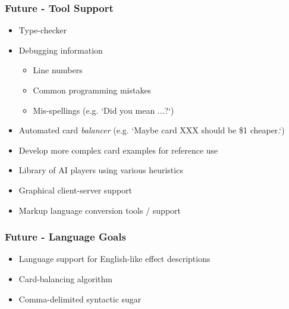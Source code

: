 
\begin{frame} \frametitle{Future - Tool Support}
\begin{itemize}
\item Type-checker
\item Debugging information
  \begin{itemize}
  \item Line numbers
  \item Common programming mistakes
  \item Mis-spellings (e.g. `Did you mean ...?`)
  \end{itemize}
\item Automated card \emph{balancer} (e.g. `Maybe card XXX should be \$1 cheaper.`)
\item Develop more complex card examples for reference use
\item Library of AI players using various heuristics
\item Graphical client-server support
\item Markup language conversion tools / support
\end{itemize}
\end{frame}

\begin{frame} \frametitle{Future - Language Goals}
\begin{itemize}
\item Language support for English-like effect descriptions
\item Card-balancing algorithm
\item Comma-delimited syntactic sugar
\end{itemize}
\end{frame}

